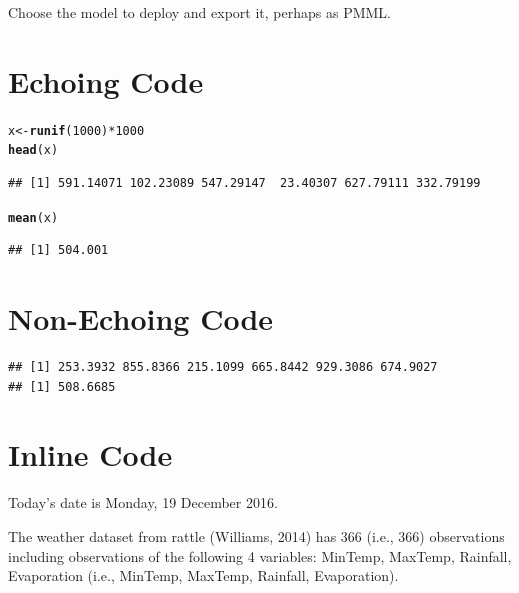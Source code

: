 \documentclass[a4paper]{article}\usepackage[]{graphicx}\usepackage[]{color}
\makeatletter
\newcommand{\hlnum}[1]{\textcolor[rgb]{0.686,0.059,0.569}{#1}}%
\newcommand{\hlopt}[1]{\textcolor[rgb]{0,0,0}{#1}}%
\newcommand{\hlstd}[1]{\textcolor[rgb]{0.345,0.345,0.345}{#1}}%
\newcommand{\hlkwb}[1]{\textcolor[rgb]{0.69,0.353,0.396}{#1}}%
\newcommand{\hlkwd}[1]{\textcolor[rgb]{0.737,0.353,0.396}{\textbf{#1}}}%
\newenvironment{kframe}{%
 \def\at@end@of@kframe{}%
 \ifinner\ifhmode%
  \def\at@end@of@kframe{\end{minipage}}%
  \begin{minipage}{\columnwidth}%
 \fi\fi%
 \def\FrameCommand##1{\hskip\@totalleftmargin \hskip-\fboxsep
 \colorbox{shadecolor}{##1}\hskip-\fboxsep
     \hskip-\linewidth \hskip-\@totalleftmargin \hskip\columnwidth}%
 \MakeFramed {\advance\hsize-\width
   \@totalleftmargin\z@ \linewidth\hsize
   \@setminipage}}%
 {\par\unskip\endMakeFramed%
 \at@end@of@kframe}
\newenvironment{knitrout}{}{} %
\makeatother
\begin{document}
Choose the model to deploy and export it, perhaps as PMML.

\section{Echoing Code}

\begin{knitrout}
\color{fgcolor}\begin{kframe}
\begin{alltt}
\hlstd{x} \hlkwb{<-} \hlkwd{runif}\hlstd{(}\hlnum{1000}\hlstd{)} \hlopt{*} \hlnum{1000}
\hlkwd{head}\hlstd{(x)}
\end{alltt}
\begin{verbatim}
## [1] 591.14071 102.23089 547.29147  23.40307 627.79111 332.79199
\end{verbatim}
\begin{alltt}
\hlkwd{mean}\hlstd{(x)}
\end{alltt}
\begin{verbatim}
## [1] 504.001
\end{verbatim}
\end{kframe}
\end{knitrout}

\section{Non-Echoing Code}

\begin{knitrout}
\color{fgcolor}\begin{kframe}
\begin{verbatim}
## [1] 253.3932 855.8366 215.1099 665.8442 929.3086 674.9027
## [1] 508.6685
\end{verbatim}
\end{kframe}
\end{knitrout}

\section{Inline Code}



Today's date is Monday, 19 December 2016.

The weather dataset from rattle (Williams, 2014) has 366 (i.e., 366) observations including
observations of the following 4 variables: MinTemp, MaxTemp, Rainfall, Evaporation
(i.e., MinTemp, MaxTemp, Rainfall, Evaporation).
\end{document}
